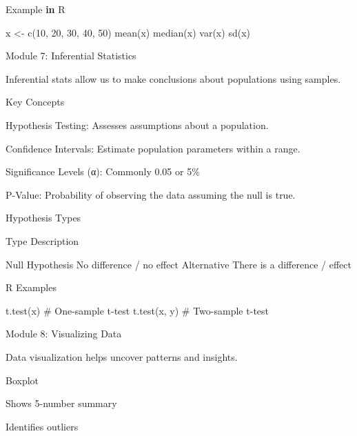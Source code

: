 \documentclass[
  letterpaper,
  DIV=11,
  numbers=noendperiod]{scrreprt}
\newenvironment{Shaded}{\begin{snugshade}}{\end{snugshade}}
\newcommand{\CommentTok}[1]{\textcolor[rgb]{0.37,0.37,0.37}{#1}}
\newcommand{\ControlFlowTok}[1]{\textcolor[rgb]{0.00,0.23,0.31}{\textbf{#1}}}
\newcommand{\DecValTok}[1]{\textcolor[rgb]{0.68,0.00,0.00}{#1}}
\newcommand{\FloatTok}[1]{\textcolor[rgb]{0.68,0.00,0.00}{#1}}
\newcommand{\FunctionTok}[1]{\textcolor[rgb]{0.28,0.35,0.67}{#1}}
\newcommand{\NormalTok}[1]{\textcolor[rgb]{0.00,0.23,0.31}{#1}}
\newcommand{\OtherTok}[1]{\textcolor[rgb]{0.00,0.23,0.31}{#1}}
\newcommand{\SpecialCharTok}[1]{\textcolor[rgb]{0.37,0.37,0.37}{#1}}
\begin{document}
\begin{Shaded}
\begin{Highlighting}[]
\NormalTok{Example }\ControlFlowTok{in}\NormalTok{ R}

\NormalTok{x }\OtherTok{\textless{}{-}} \FunctionTok{c}\NormalTok{(}\DecValTok{10}\NormalTok{, }\DecValTok{20}\NormalTok{, }\DecValTok{30}\NormalTok{, }\DecValTok{40}\NormalTok{, }\DecValTok{50}\NormalTok{)}
\FunctionTok{mean}\NormalTok{(x)}
\FunctionTok{median}\NormalTok{(x)}
\FunctionTok{var}\NormalTok{(x)}
\FunctionTok{sd}\NormalTok{(x)}

\NormalTok{Module }\DecValTok{7}\SpecialCharTok{:}\NormalTok{ Inferential Statistics}

\NormalTok{Inferential stats allow us to make conclusions about populations using samples.}

\NormalTok{Key Concepts}

\NormalTok{Hypothesis Testing}\SpecialCharTok{:}\NormalTok{ Assesses assumptions about a population.}

\NormalTok{Confidence Intervals}\SpecialCharTok{:}\NormalTok{ Estimate population parameters within a range.}

\NormalTok{Significance }\FunctionTok{Levels}\NormalTok{ (α)}\SpecialCharTok{:}\NormalTok{ Commonly }\FloatTok{0.05}\NormalTok{ or }\DecValTok{5}\NormalTok{\%}

\NormalTok{P}\SpecialCharTok{{-}}\NormalTok{Value}\SpecialCharTok{:}\NormalTok{ Probability of observing the data assuming the null is true.}


\NormalTok{Hypothesis Types}

\NormalTok{Type    Description}

\NormalTok{Null Hypothesis No difference }\SpecialCharTok{/}\NormalTok{ no effect}
\NormalTok{Alternative There is a difference }\SpecialCharTok{/}\NormalTok{ effect}


\NormalTok{R Examples}

\FunctionTok{t.test}\NormalTok{(x)                 }\CommentTok{\# One{-}sample t{-}test}
\FunctionTok{t.test}\NormalTok{(x, y)              }\CommentTok{\# Two{-}sample t{-}test}

\NormalTok{Module }\DecValTok{8}\SpecialCharTok{:}\NormalTok{ Visualizing Data}

\NormalTok{Data visualization helps uncover patterns and insights.}

\NormalTok{Boxplot}

\NormalTok{Shows }\DecValTok{5}\SpecialCharTok{{-}}\NormalTok{number summary}

\NormalTok{Identifies outliers}



\end{Highlighting}
\end{Shaded}
\end{document}
